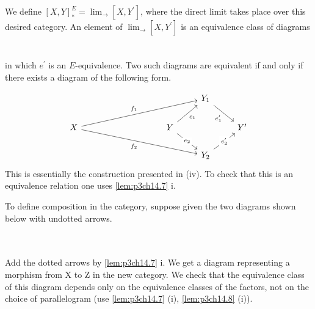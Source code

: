 \documentclass[../main]{subfiles}
\begin{document}
We define $\left[X,Y\right]^E_{\ast} = \displaystyle{\lim_{ \to }} \left[X,Y^{\prime}\right] $, where the direct limit takes place over this desired category. An element of $\displaystyle{\lim_{ \to } \left[X,Y^{\prime}\right]}$ is an equivalence class of diagrams  \\
 ~\\~\\
in which $e^{\prime}$ is an $E$-equivalence. Two such diagrams are equivalent if and only if there exists a diagram of the following form.

\[\begin{tikzcd}
	&&&&& {Y_1} \\
	X &&&& Y && {Y'} \\
	&&&&& {Y_2}
	\arrow["{f_1}", from=2-1, to=1-6]
	\arrow["{f_2}"', from=2-1, to=3-6]
	\arrow["{e_1}"', from=2-5, to=1-6]
	\arrow["{e'_1}"', from=1-6, to=2-7]
	\arrow["{e'_2}"{description}, from=3-6, to=2-7]
	\arrow["{e_2}"{description}, from=2-5, to=3-6]
\end{tikzcd}\]
This is essentially the construction presented in (iv). To check that this is an equivalence relation one uses \ref{lem:p3ch14.7} {i}.

To define composition in the category, suppose given the two diagrams shown below with undotted arrows.

~\\~\\Add the dotted arrows by \ref{lem:p3ch14.7} {i}. We get a diagram representing a morphism from X to Z in the new category. We check that the equivalence class of this diagram depends only on the equivalence classes of the factors, not on the choice of parallelogram (use \ref{lem:p3ch14.7} (i), \ref{lem:p3ch14.8} (i)).
\end{document}
